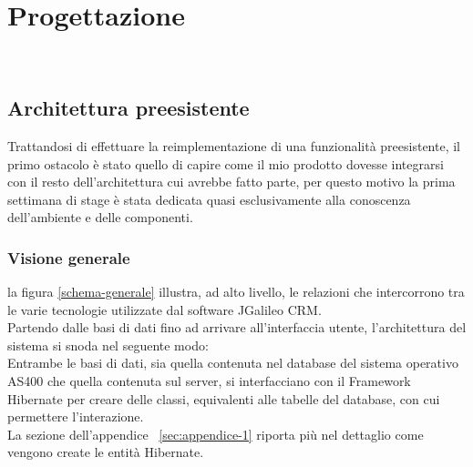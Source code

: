 
\chapter{Progettazione}
\label{cap:progettazione}

\\ %

\section{Architettura preesistente}
Trattandosi di effettuare la reimplementazione di una funzionalità preesistente, il primo ostacolo è stato quello di capire come il mio prodotto dovesse integrarsi con il resto dell'architettura cui avrebbe fatto parte, per questo motivo la prima settimana di stage è stata dedicata quasi esclusivamente alla conoscenza dell'ambiente e delle componenti. \\

\subsection{Visione generale}


la figura \ref{schema-generale} illustra, ad alto livello, le relazioni che intercorrono tra le varie tecnologie utilizzate dal software JGalileo CRM.\\
Partendo dalle basi di dati fino ad arrivare all'interfaccia utente, l'architettura del sistema si snoda nel seguente modo:\\
Entrambe le basi di dati, sia quella contenuta nel database del sistema operativo AS400 che quella contenuta sul server, si interfacciano con il Framework Hibernate per creare delle classi, equivalenti alle tabelle del database, con cui permettere l'interazione.\\ 
La sezione dell'appendice ~\ref{sec:appendice-1} riporta più nel dettaglio come vengono create le entità Hibernate.\\

\newpage

